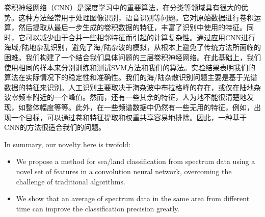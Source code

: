 卷积神经网络（CNN）是深度学习中的重要算法，在分类等领域具有很大的优势。这种方法经常用于处理图像识别，语音识别等问题。它对原始数据进行卷积运算，然后提取从最后一步生成的卷积数据的特征，丰富了识别中使用的特征。同时，它可以减少由于合并一些相邻特征而引起的计算复杂性。通过应用CNN进行海域/陆地杂乱识别，避免了海/陆杂波的模拟，从根本上避免了传统方法所面临的困难。我们构建了一个结合我们具体问题的三层卷积神经网络。在此基础上，我们使用相同的样本来分别训练和测试SVM方法和我们的算法。实验结果表明我们的算法在实际情况下的稳定性和准确性。我们的海/陆杂散识别问题主要是基于光谱数据的特征来识别。人工识别主要取决于海杂波中布拉格峰的存在，或仅在陆地杂波零频率附近的一个峰值。然而，还有一些其余的特征，人为地不能很清楚地发现，如整体幅度等等。此外，在一些频谱数据中仍然有一些无用的特征，例如，出现一个目标，可以通过卷和特征提取和权重共享容易地排除。因此，一种基于CNN的方法很适合我们的问题。

In summary, our novelty here is twofold:
\begin{itemize}
	\item We propose a method for sea/land classification from spectrum data using a novel set of features in a convolution neural network, overcoming the challenge of traditional algorithms.
	\item We show that an average of spectrum data in  the same area from different time can improve the classification precision greatly.
\end{itemize}

